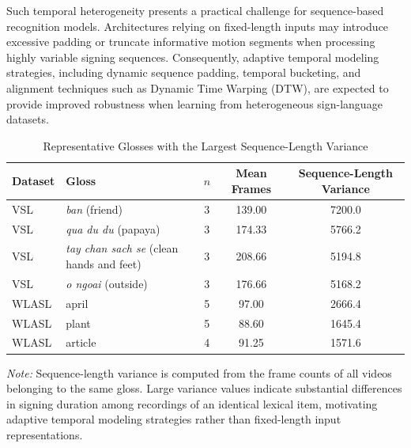 \documentclass{ieeeaccess}
\DeclareRobustCommand{\textbf}[1]{{\bfseries #1}}
\begin{document}
Such temporal heterogeneity presents a practical challenge for sequence-based recognition models. Architectures relying on fixed-length inputs may introduce excessive padding or truncate informative motion segments when processing highly variable signing sequences. Consequently, adaptive temporal modeling strategies, including dynamic sequence padding, temporal bucketing, and alignment techniques such as Dynamic Time Warping (DTW), are expected to provide improved robustness when learning from heterogeneous sign-language datasets.

\begin{table}[!t]
\caption{Representative Glosses with the Largest Sequence-Length Variance}
\label{tab:app_sequence}

\centering
\small
\setlength{\tabcolsep}{6pt}

\begin{tabular}{llccc}
\toprule
\textbf{Dataset} &
\textbf{Gloss} &
\textbf{$n$} &
\textbf{Mean Frames} &
\textbf{Sequence-Length Variance} \\
\midrule

VSL &
\textit{ban} (friend) &
3 &
139.00 &
7200.0 \\

VSL &
\textit{qua du du} (papaya) &
3 &
174.33 &
5766.2 \\

VSL &
\textit{tay chan sach se} (clean hands and feet) &
3 &
208.66 &
5194.8 \\

VSL &
\textit{o ngoai} (outside) &
3 &
176.66 &
5168.2 \\

\midrule

WLASL &
april &
5 &
97.00 &
2666.4 \\

WLASL &
plant &
5 &
88.60 &
1645.4 \\

WLASL &
article &
4 &
91.25 &
1571.6 \\

\bottomrule
\end{tabular}

\vspace{2mm}

\footnotesize
\textit{Note:}
Sequence-length variance is computed from the frame counts of all videos belonging to the same gloss.
Large variance values indicate substantial differences in signing duration among recordings of an identical lexical item, motivating adaptive temporal modeling strategies rather than fixed-length input representations.

\end{table}
\end{document}
